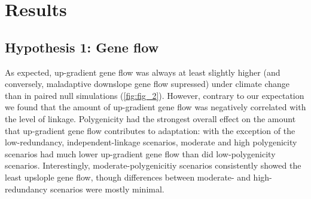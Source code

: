 \documentclass[9pt,twocolumn,twoside,lineno]{pnas-new}
\begin{document}
\section*{Results}

\subsection{Hypothesis 1: Gene flow}
As expected, up-gradient gene flow was always at least slightly higher
(and conversely, maladaptive downslope gene flow supressed) 
under climate change than in paired null simulations (\ref{fig:fig_2}).
However, contrary to our expectation we found that the amount of up-gradient gene flow
was negatively correlated with the level of linkage.
Polygenicity had the strongest overall effect on the amount that up-gradient gene flow contributes to adaptation:
with the exception of the low-redundancy, independent-linkage scenarios,
moderate and high polygenicity scenarios had much lower up-gradient gene flow
than did low-polygenicity scenarios. 
Interestingly, moderate-polygenicitiy scenarios consistently showed the least upslople gene flow,
though differences between moderate- and high-redundancy scenarios were mostly minimal.
\end{document}
